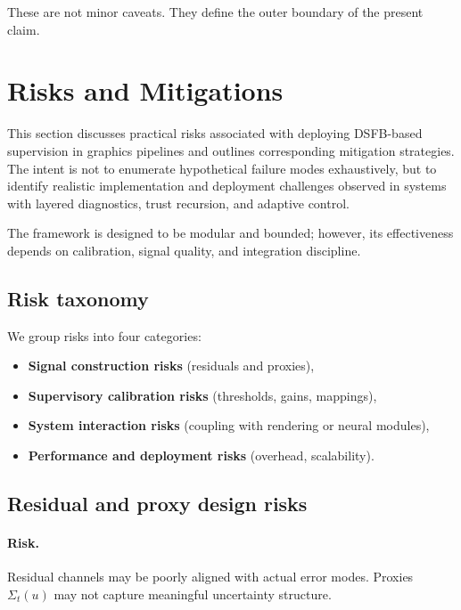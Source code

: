 \documentclass[11pt]{article}
\theoremstyle{definition}
\theoremstyle{plain}
\begin{document}
These are not minor caveats. They define the outer boundary of the present claim.

\section{Risks and Mitigations}
\label{sec:risks}

This section discusses practical risks associated with deploying DSFB-based supervision in graphics pipelines and outlines corresponding mitigation strategies. The intent is not to enumerate hypothetical failure modes exhaustively, but to identify realistic implementation and deployment challenges observed in systems with layered diagnostics, trust recursion, and adaptive control.

The framework is designed to be modular and bounded; however, its effectiveness depends on calibration, signal quality, and integration discipline.


\subsection{Risk taxonomy}

We group risks into four categories:

\begin{itemize}[leftmargin=1.5em]
    \item \textbf{Signal construction risks} (residuals and proxies),
    \item \textbf{Supervisory calibration risks} (thresholds, gains, mappings),
    \item \textbf{System interaction risks} (coupling with rendering or neural modules),
    \item \textbf{Performance and deployment risks} (overhead, scalability).
\end{itemize}


\subsection{Residual and proxy design risks}

\paragraph{Risk.}
Residual channels may be poorly aligned with actual error modes. Proxies $\Sigma_t(u)$ may not capture meaningful uncertainty structure.
\end{document}
